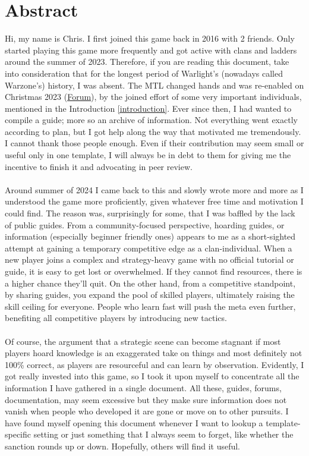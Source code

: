 \section*{Abstract} \label{abstract}

Hi, my name is Chris. I first joined this game back in 2016 with 2 friends. Only started playing this game more frequently and got active with clans and ladders around the summer of 2023. Therefore, if you are reading this document, take into consideration that for the longest period of Warlight's (nowadays called Warzone's) history, I was absent. The MTL changed hands and was re-enabled on Christmas 2023 (\href{https://www.warzone.com/Forum/734956-join-multitemplate-ladder-mtl}{Forum}), by the joined effort of some very important individuals, mentioned in the Introduction \ref{introduction}. Ever since then, I had wanted to compile a guide; more so an archive of information. Not everything went exactly according to plan, but I got help along the way that motivated me tremendously. I cannot thank those people enough. Even if their contribution may seem small or useful only in one template, I will always be in debt to them for giving me the incentive to finish it and advocating in peer review. 
\\
\\
Around summer of 2024 I came back to this and slowly wrote more and more as I understood the game more proficiently, given whatever free time and motivation I could find. The reason was, surprisingly for some, that I was baffled by the lack of public guides. From a community-focused perspective, hoarding guides, or information (especially beginner friendly ones) appears to me as a short-sighted attempt at gaining a temporary competitive edge as a clan-individual. When a new player joins a complex and strategy-heavy game with no official tutorial or guide, it is easy to get lost or overwhelmed. If they cannot find resources, there is a higher chance they'll quit. On the other hand, from a competitive standpoint, by sharing guides, you expand the pool of skilled players, ultimately raising the skill ceiling for everyone. People who learn fast will push the meta even further, benefiting all competitive players by introducing new tactics.
\\
\\
Of course, the argument that a strategic scene can become stagnant if most players hoard knowledge is an exaggerated take on things and most definitely not 100\% correct, as players are resourceful and can learn by observation. Evidently, I got really invested into this game, so I took it upon myself to concentrate all the information I have gathered in a single document. All these, guides, forums, documentation, may seem excessive but they make sure information does not vanish when people who developed it are gone or move on to other pursuits. I have found myself opening this document whenever I want to lookup a template-specific setting or just something that I always seem to forget, like whether the sanction rounds up or down. Hopefully, others will find it useful.
